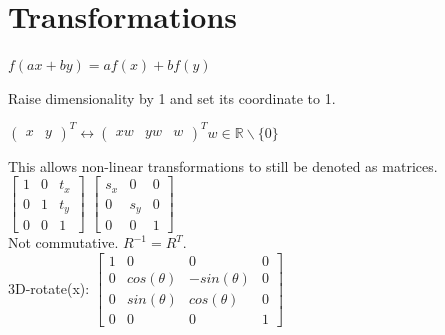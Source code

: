 \section{Transformations}
$f(ax + by) = af(x) + bf(y)$

 Raise dimensionality by 1 and set its coordinate to 1. 
\begin{center}
$
\begin{pmatrix}
        x & y 
\end{pmatrix}^T \leftrightarrow 
\begin{pmatrix}
        xw & yw & w 
\end{pmatrix}^T
w \in \mathbb{R}\backslash\{0\}
$
\end{center}
This allows non-linear transformations to still be denoted as matrices. \\
    $\begin{bmatrix}
            1 & 0 & t_x \\
            0 & 1 & t_y \\
            0 & 0 & 1
    \end{bmatrix}$
$\begin{bmatrix}
        s_x & 0 & 0 \\
        0 & s_y & 0 \\
        0 & 0 & 1
\end{bmatrix}$ \\
Not commutative. $R^{-1} = R^T$. \\
3D-rotate(x):
$\begin{bmatrix}
        1 & 0 & 0 & 0 \\
        0 & cos(\theta) & -sin(\theta) & 0 \\
        0 & sin(\theta) & cos(\theta) & 0\\
        0 & 0 & 0 & 1
\end{bmatrix}$\\
